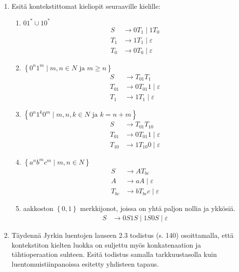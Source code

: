 \documentclass[a4paper,11pt]{article}
\newcommand{\set}[1]{{\left\{ #1 \right\}}}
\begin{document}
\begin{enumerate}
\item
  Esitä kontekstittomat  kieliopit seuraaville kielille:
  \begin{enumerate}
  \item $01^\ast\cup10^\ast$
    \begin{align*}
      S   & \to 0T_1 \mid 1T_0 \\
      T_1 & \to 1T_1 \mid \varepsilon \\
      T_0 & \to 0T_0 \mid \varepsilon
    \end{align*}
  \item $\set{0^n1^m\mid\mbox{$m,n\in N$ ja $m\geq n$}}$
    \begin{align*}
      S      & \to T_{01} T_1 \\
      T_{01} & \to 0T_{01}1 \mid \varepsilon \\
      T_{1}  & \to 1T_1 \mid \varepsilon
    \end{align*}
  \item $\set{0^n1^k0^m\mid\mbox{$m,n,k\in N$ ja $k=n+m$}}$
    \begin{align*}
      S      & \to T_{01} T_{10} \\
      T_{01} & \to 0T_{01}1 \mid \varepsilon \\
      T_{10} & \to 1T_{10}0 \mid \varepsilon
    \end{align*}
  \item $\set{a^n b^m c^m\mid m,n\in N}$
    \begin{align*}
      S      & \to AT_{bc} \\
      A      & \to aA       \mid \varepsilon \\
      T_{bc} & \to bT_{bc}c \mid \varepsilon
    \end{align*}
  \item
    aakkoston $\set{0,1}$ merkkijonot, joissa on yhtä paljon nollia ja
    ykkösiä.
    \begin{align*}
      S & \to 0S1S \mid 1S0S \mid \varepsilon
    \end{align*}
  \end{enumerate}

\item
  Täydennä Jyrkin luentojen lauseen 2.3 todistus (s. 140)
  osoittamalla, että kontekstiton kielten luokka on suljettu myös
  konkatenaation ja tähtioperaation suhteen. Esitä todistus samalla
  tarkkuustasolla kuin luentomuistiinpanoissa esitetty yhdisteen
  tapaus.
  

\end{enumerate}
\end{document}

